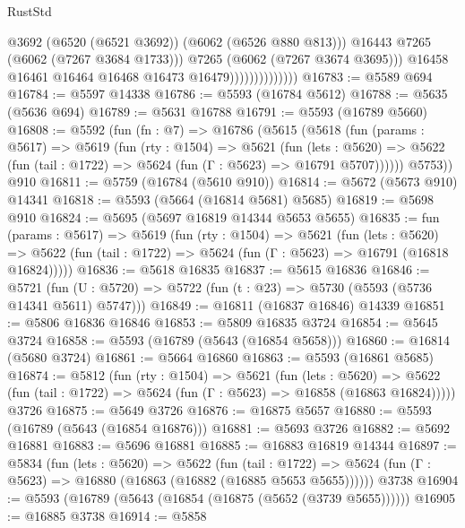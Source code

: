 \begin{lexlean}{RustStd}
\begin{coremodule}
                                      @3692
                                      (@6520 (@6521 @3692))
                                      (@6062 (@6526 @880 @813)))
                                    @16443
                                    @7265
                                    (@6062 (@7267 @3684 @1733)))
                                  @7265
                                  (@6062 (@7267 @3674 @3695)))
                                @16458
                                @16461
                                @16464
                                @16468
                                @16473
                                @16479))))))))))))))
@16783 := @5589 @694
@16784 := @5597 @14338
@16786 := @5593 (@16784 @5612)
@16788 := @5635 (@5636 @694)
@16789 := @5631 @16788
@16791 := @5593 (@16789 @5660)
@16808 := @5592
    (fun (fn : @7) =>
    @16786
      (@5615
        (@5618
          (fun (params : @5617) =>
          @5619
            (fun (rty : @1504) =>
            @5621
              (fun (lets : @5620) =>
              @5622 (fun (tail : @1722) => @5624 (fun (Γ : @5623) => @16791 @5707))))))
        @5753))
    @910
@16811 := @5759 (@16784 (@5610 @910))
@16814 := @5672 (@5673 @910) @14341
@16818 := @5593 (@5664 (@16814 @5681) @5685)
@16819 := @5698 @910
@16824 := @5695 (@5697 @16819 @14344 @5653 @5655)
@16835 := fun (params : @5617) =>
  @5619
    (fun (rty : @1504) =>
    @5621
      (fun (lets : @5620) =>
      @5622 (fun (tail : @1722) => @5624 (fun (Γ : @5623) => @16791 (@16818 @16824)))))
@16836 := @5618 @16835
@16837 := @5615 @16836
@16846 := @5721
    (fun (U : @5720) => @5722 (fun (t : @23) => @5730 (@5593 (@5736 @14341 @5611) @5747)))
@16849 := @16811 (@16837 @16846) @14339
@16851 := @5806 @16836 @16846
@16853 := @5809 @16835 @3724
@16854 := @5645 @3724
@16858 := @5593 (@16789 (@5643 (@16854 @5658)))
@16860 := @16814 (@5680 @3724)
@16861 := @5664 @16860
@16863 := @5593 (@16861 @5685)
@16874 := @5812
    (fun (rty : @1504) =>
    @5621
      (fun (lets : @5620) =>
      @5622 (fun (tail : @1722) => @5624 (fun (Γ : @5623) => @16858 (@16863 @16824)))))
    @3726
@16875 := @5649 @3726
@16876 := @16875 @5657
@16880 := @5593 (@16789 (@5643 (@16854 @16876)))
@16881 := @5693 @3726
@16882 := @5692 @16881
@16883 := @5696 @16881
@16885 := @16883 @16819 @14344
@16897 := @5834
    (fun (lets : @5620) =>
    @5622
      (fun (tail : @1722) =>
      @5624 (fun (Γ : @5623) => @16880 (@16863 (@16882 (@16885 @5653 @5655))))))
    @3738
@16904 := @5593 (@16789 (@5643 (@16854 (@16875 (@5652 (@3739 @5655))))))
@16905 := @16885 @3738
@16914 := @5858

\end{coremodule}
\end{lexlean}

